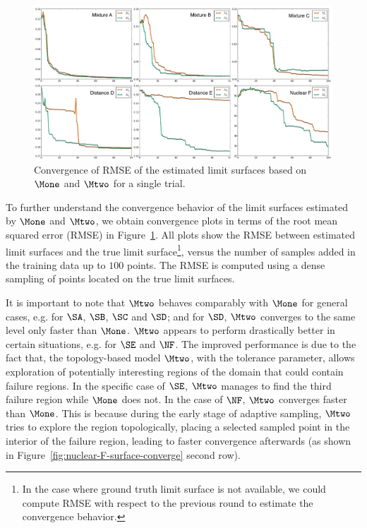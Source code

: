 \begin{figure}[!ht]
\centering
\includegraphics[width=1.0\textwidth]{figs/chap5/RMSE-convergence.pdf}
\caption{Convergence of RMSE of the estimated limit surfaces based on $\protect\Mone$ and $\protect\Mtwo$ for a single trial.}
\label{fig:RMSE-convergence}
\end{figure}

To further understand the convergence behavior of the limit surfaces estimated by $\Mone$ and $\Mtwo$, we obtain convergence plots in terms of the root mean squared error (RMSE) in Figure~\ref{fig:RMSE-convergence}.
%
All plots show the RMSE between estimated limit surfaces and the true limit surface\footnote{In the case where ground truth limit surface is not available, we could compute RMSE with respect to the previous round to estimate the convergence behavior.}, versus the number of samples added in the training data up to $100$ points.
%
The RMSE is computed using a dense sampling of points located on the true limit surfaces.

It is important to note that $\Mtwo$ behaves comparably with $\Mone$ for general cases, e.g. for $\SA$, $\SB$, $\SC$ and $\SD$; and for $\SD$, $\Mtwo$ converges to the same level only faster than $\Mone$.
%
$\Mtwo$ appears to perform drastically better in certain situations, e.g. for $\SE$ and $\NF$.
%
The improved performance is due to the fact that, the topology-based model $\Mtwo$, with the tolerance parameter, allows exploration of potentially interesting regions of the domain that could contain failure regions.
%
In the specific case of $\SE$, $\Mtwo$ manages to find the third failure region while $\Mone$ does not.
%
In the case of $\NF$, $\Mtwo$ converges faster than $\Mone$.
%
This is because during the early stage of adaptive sampling, $\Mtwo$ tries to explore the region topologically, placing a selected sampled point in the interior of the failure region, leading to faster convergence afterwards (as shown in Figure~\ref{fig:nuclear-F-surface-converge} second row).

